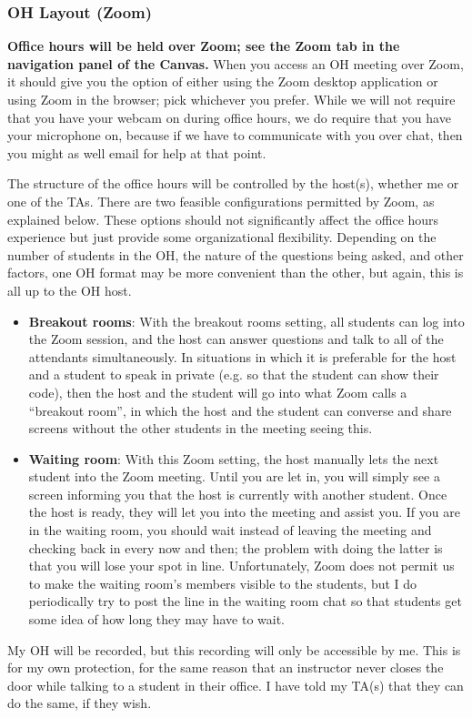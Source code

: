 \documentclass{article}
\begin{document}
\subsubsection{OH Layout (Zoom)}

\textbf{Office hours will be held over Zoom; see the Zoom tab in the navigation panel of the Canvas.} When you access an OH meeting over Zoom, it should give you the option of either using the Zoom desktop application or using Zoom in the browser; pick whichever you prefer. While we will not require that you have your webcam on during office hours, we do require that you have your microphone on, because if we have to communicate with you over chat, then you might as well email for help at that point.

The structure of the office hours will be controlled by the host(s), whether me or one of the TAs. There are two feasible configurations permitted by Zoom, as explained below. These options should not significantly affect the office hours experience but just provide some organizational flexibility. Depending on the number of students in the OH, the nature of the questions being asked, and other factors, one OH format may be more convenient than the other, but again, this is all up to the OH host.

\begin{itemize}[itemsep=0mm, parsep=0pt]
\item \textbf{Breakout rooms}: With the breakout rooms setting, all students can log into the Zoom session, and the host can answer questions and talk to all of the attendants simultaneously. In situations in which it is preferable for the host and a student to speak in private (e.g. so that the student can show their code), then the host and the student will go into what Zoom calls a ``breakout room'', in which the host and the student can converse and share screens without the other students in the meeting seeing this.
\item \textbf{Waiting room}: With this Zoom setting, the host manually lets the next student into the Zoom meeting. Until you are let in, you will simply see a screen informing you that the host is currently with another student. Once the host is ready, they will let you into the meeting and assist you. If you are in the waiting room, you should wait instead of leaving the meeting and checking back in every now and then; the problem with doing the latter is that you will lose your spot in line. Unfortunately, Zoom does not permit us to make the waiting room's members visible to the students, but I do periodically try to post the line in the waiting room chat so that students get some idea of how long they may have to wait.
\end{itemize}

My OH will be recorded, but this recording will only be accessible by me. This is for my own protection, for the same reason that an instructor never closes the door while talking to a student in their office. I have told my TA(s) that they can do the same, if they wish.
\end{document}
